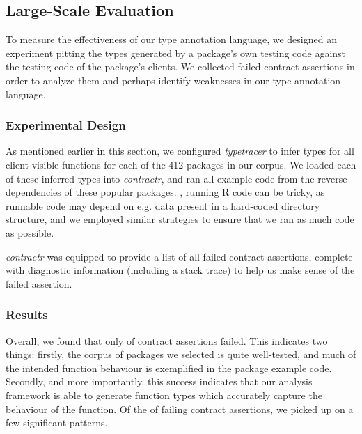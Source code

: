 \documentclass[acmsmall,review,anonymous]{acmart}\settopmatter{printfolios=true,printccs=false,printacmref=false}
\newcommand{\contractr}{\emph{contractr}\xspace} %
\newcommand{\typetracer}{\emph{typetracer}\xspace} %
\begin{document}
%
%
%
%
\subsection{Large-Scale Evaluation}
\label{subsec:eval}

To measure the effectiveness of our type annotation language, we designed an experiment pitting the types generated by a package's own testing code against the testing code of the package's clients.
We collected failed contract assertions in order to analyze them and perhaps identify weaknesses in our type annotation language.

%
%
\subsubsection{Experimental Design}

As mentioned earlier in this section, we configured \typetracer to infer types for all client-visible functions for each of the 412 packages in our corpus.
We loaded each of these inferred types into \contractr, and ran all example code from the reverse dependencies of these popular packages.
, running R code can be tricky, as runnable code may depend on e.g. data present in a hard-coded directory structure, and we employed similar strategies to ensure that we ran as much code as possible.

\contractr was equipped to provide a list of all failed contract assertions, complete with diagnostic information (including a stack trace) to help us make sense of the failed assertion.

%
%
\subsubsection{Results}


Overall, we found that only  of contract assertions failed.
This indicates two things: firstly, the corpus of packages we selected is quite well-tested, and much of the intended function behaviour is exemplified in the package example code. 
Secondly, and more importantly, this success indicates that our analysis framework is able to generate function types which accurately capture the behaviour of the function. 
Of the  of failing contract assertions, we picked up on a few significant patterns.
\end{document}
